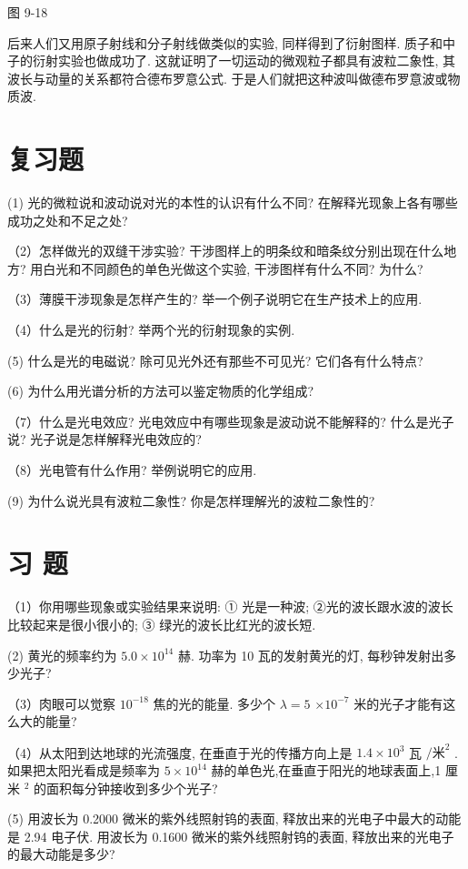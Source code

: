 \documentclass[10pt]{article}
\begin{document}
图 9-18

后来人们又用原子射线和分子射线做类似的实验, 同样得到了衍射图样. 质子和中子的衍射实验也做成功了. 这就证明了一切运动的微观粒子都具有波粒二象性, 其波长与动量的关系都符合德布罗意公式. 于是人们就把这种波叫做德布罗意波或物质波.

\section*{复习题}

(1) 光的微粒说和波动说对光的本性的认识有什么不同? 在解释光现象上各有哪些成功之处和不足之处?

（2）怎样做光的双缝干涉实验? 干涉图样上的明条纹和暗条纹分别出现在什么地方? 用白光和不同颜色的单色光做这个实验, 干涉图样有什么不同? 为什么?

（3）薄膜干涉现象是怎样产生的? 举一个例子说明它在生产技术上的应用.

（4）什么是光的衍射? 举两个光的衍射现象的实例.

(5) 什么是光的电磁说? 除可见光外还有那些不可见光? 它们各有什么特点?

(6) 为什么用光谱分析的方法可以鉴定物质的化学组成?

（7）什么是光电效应? 光电效应中有哪些现象是波动说不能解释的? 什么是光子说? 光子说是怎样解释光电效应的?

（8）光电管有什么作用? 举例说明它的应用.

(9) 为什么说光具有波粒二象性? 你是怎样理解光的波粒二象性的?

\section*{习 题}

（1）你用哪些现象或实验结果来说明: ① 光是一种波; ②光的波长跟水波的波长比较起来是很小很小的; ③ 绿光的波长比红光的波长短.

(2) 黄光的频率约为 \({5.0} \times {10}^{14}\) 赫. 功率为 10 瓦的发射黄光的灯, 每秒钟发射出多少光子?

（3）肉眼可以觉察 \({10}^{-{18}}\) 焦的光的能量. 多少个 \(\lambda = 5\) \(\times {10}^{-7}\) 米的光子才能有这么大的能量?

（4）从太阳到达地球的光流强度, 在垂直于光的传播方向上是 \({1.4} \times {10}^{3}\) 瓦 \(/{\text{米}}^{2}\) . 如果把太阳光看成是频率为 \(5 \times {10}^{14}\) 赫的单色光,在垂直于阳光的地球表面上,1 厘米 \({}^{2}\) 的面积每分钟接收到多少个光子?

(5) 用波长为 0.2000 微米的紫外线照射钨的表面, 释放出来的光电子中最大的动能是 2.94 电子伏. 用波长为 0.1600 微米的紫外线照射钨的表面, 释放出来的光电子的最大动能是多少?
\end{document}
